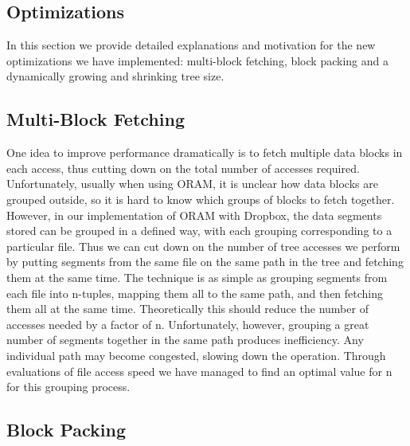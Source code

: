 \documentclass{article}
\begin{document}
\begin{multicols}{2}

\section{Optimizations}

In this section we provide detailed explanations and motivation for the new optimizations we have implemented: multi-block fetching, block packing and a dynamically growing and shrinking tree size.

\subsection{Multi-Block Fetching}

One idea to improve performance dramatically is to fetch multiple data blocks in each access, thus cutting down on the total number of accesses required. Unfortunately, usually when using ORAM, it is unclear how data blocks are grouped outside, so it is hard to know which groups of blocks to fetch together. However, in our implementation of ORAM with Dropbox, the data segments stored can be grouped in a defined way, with each grouping corresponding to a particular file. Thus we can cut down on the number of tree accesses we perform by putting segments from the same file on the same path in the tree and fetching them at the same time. The technique is as simple as grouping segments from each file into n-tuples, mapping them all to the same path, and then fetching them all at the same time. Theoretically this should reduce the number of accesses needed by a factor of n. Unfortunately, however, grouping a great number of segments together in the same path produces inefficiency. Any individual path may become congested, slowing down the operation. Through evaluations of file access speed we have managed to find an optimal value for n for this grouping process.

\subsection{Block Packing}


\end{multicols}
\end{document}
